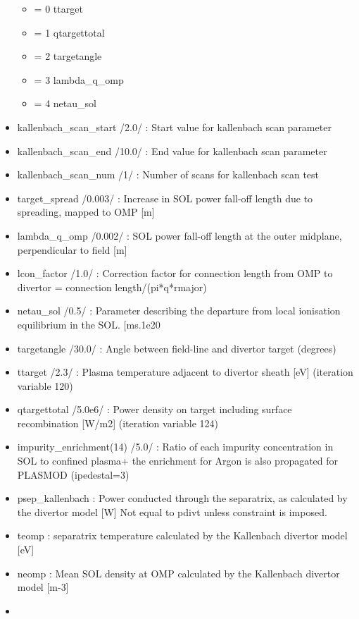 \documentclass[]{article}
\providecommand{\tightlist}{%
  \setlength{\itemsep}{0pt}\setlength{\parskip}{0pt}}
\begin{document}
\begin{itemize}
  \begin{itemize}
  \tightlist
  \item
    = 0 ttarget
  \item
    = 1 qtargettotal
  \item
    = 2 targetangle
  \item
    = 3 lambda\_q\_omp
  \item
    = 4 netau\_sol
  \end{itemize}
\item
  kallenbach\_scan\_start /2.0/ : Start value for kallenbach scan
  parameter
\item
  kallenbach\_scan\_end /10.0/ : End value for kallenbach scan parameter
\item
  kallenbach\_scan\_num /1/ : Number of scans for kallenbach scan test
\item
  target\_spread /0.003/ : Increase in SOL power fall-off length due to
  spreading, mapped to OMP {[}m{]}
\item
  lambda\_q\_omp /0.002/ : SOL power fall-off length at the outer
  midplane, perpendicular to field {[}m{]}
\item
  lcon\_factor /1.0/ : Correction factor for connection length from OMP
  to divertor = connection length/(pi*q*rmajor)
\item
  netau\_sol /0.5/ : Parameter describing the departure from local
  ionisation equilibrium in the SOL. {[}ms.1e20
\item
  targetangle /30.0/ : Angle between field-line and divertor target
  (degrees)
\item
  ttarget /2.3/ : Plasma temperature adjacent to divertor sheath
  {[}eV{]} (iteration variable 120)
\item
  qtargettotal /5.0e6/ : Power density on target including surface
  recombination {[}W/m2{]} (iteration variable 124)
\item
  impurity\_enrichment(14) /5.0/ : Ratio of each impurity concentration
  in SOL to confined plasma+ the enrichment for Argon is also propagated
  for PLASMOD (ipedestal=3)
\item
  psep\_kallenbach : Power conducted through the separatrix, as
  calculated by the divertor model {[}W{]} Not equal to pdivt unless
  constraint is imposed.
\item
  teomp : separatrix temperature calculated by the Kallenbach divertor
  model {[}eV{]}
\item
  neomp : Mean SOL density at OMP calculated by the Kallenbach divertor
  model {[}m-3{]}
\item

\end{itemize}
\end{document}
